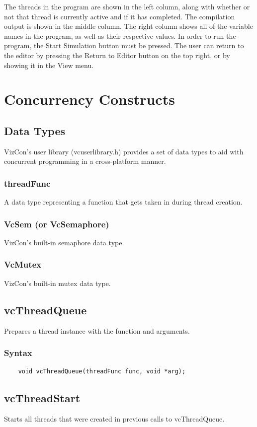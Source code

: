 \documentclass{article}
\begin{document}
The threads in the program are shown in the left column, along with whether or not that thread is currently active and if it has completed. The compilation output is shown in the middle column. The right column shows all of the variable names in the program, as well as their respective values. In order to run the program, the Start Simulation button must be pressed. The user can return to the editor by pressing the Return to Editor button on the top right, or by showing it in the View menu.

\section{Concurrency Constructs}
\subsection{Data Types}
VizCon's user library (vcuserlibrary.h) provides a set of data types to aid with concurrent programming in a cross-platform manner.
\subsubsection{threadFunc}
A data type representing a function that gets taken in during thread creation.
\subsubsection{VcSem (or VcSemaphore)}
VizCon's built-in semaphore data type. 
\subsubsection{VcMutex}
VizCon's built-in mutex data type.

\subsection{vcThreadQueue}
Prepares a thread instance with the function and arguments.
\subsubsection{Syntax}
\begin{verbatim}
    void vcThreadQueue(threadFunc func, void *arg);   
\end{verbatim}

\subsection{vcThreadStart}
Starts all threads that were created in previous calls to vcThreadQueue.
\end{document}
